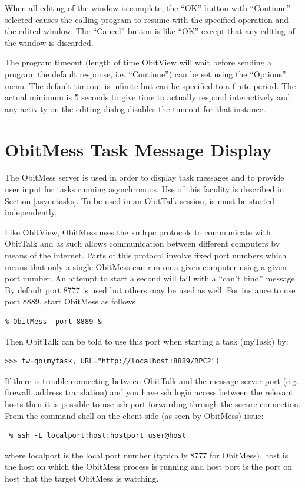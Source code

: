 \documentclass[11pt]{report}
\begin{document}
When all editing of the window is complete, the ``OK'' button with
``Continue'' selected causes the calling program to resume with the
specified operation and the edited window.
The ``Cancel'' button is like ``OK'' except that any editing of the
window is discarded.

The program timeout (length of time ObitView will wait before sending
a program the default response, i.e. ``Continue'') can be set using
the ``Options'' menu.
The default timeout is infinite but can be specified to a finite
period.
The actual minimum is 5 seconds to give time to actually respond
interactively and any activity on the editing dialog disables the
timeout for that instance.

\section{ObitMess Task Message Display\label{ObitMess}}
The ObitMess server is used in order to display task messages and to
provide user input for tasks running asynchronous.
Use of this faculity is described in Section \ref{asynctasks}.
To be used in an ObitTalk session, is must be started independently.

Like ObitView, ObitMess uses the xmlrpc protocols to communicate
with ObitTalk and as such allows communication between different
computers by means of the internet.
Parts of this protocol involve fixed port numbers which means that only
a single ObitMess can run on a given computer using a given port
number.
An attempt to start a second will fail with a ``can't bind'' message.
By default port 8777 is used but others may be used as well.
For instance to use port 8889, start ObitMess as follows
\begin{verbatim}
% ObitMess -port 8889 &
\end{verbatim}
Then ObitTalk can be told to use this port when starting a task
(myTask) by:
\begin{verbatim}
>>> tw=go(mytask, URL="http://localhost:8889/RPC2")
\end{verbatim}

If there is trouble connecting between ObitTalk and the message server
port (e.g. firewall, address translation) and you have ssh login access
between the relevant hosts then it is possible to use ssh port
forwarding through the secure connection.
From the command shell on the client side (as seen by ObitMess)
issue:
\begin{verbatim}
 % ssh -L localport:host:hostport user@host
\end{verbatim}
where localport is the local port number (typically 8777 for
ObitMess), host is the host on which the ObitMess process is running
and host port is the port on host that the target ObitMess is
watching.
\end{document}
